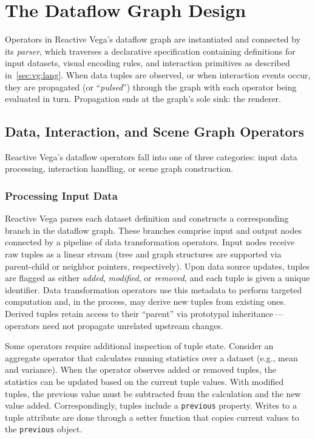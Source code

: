 \section{The Dataflow Graph Design}
\label{sec:vg:dataflow}

Operators in Reactive Vega's dataflow graph are instantiated and connected by
its \emph{parser}, which traverses a declarative specification containing
definitions for input datasets, visual encoding rules, and interaction
primitives as described in~\cref{sec:vg:lang}. When data tuples are observed, or
when interaction events occur, they are propagated (or ``\emph{pulsed}'')
through the graph with each operator being evaluated in turn. Propagation ends
at the graph's sole sink: the renderer.

\subsection{Data, Interaction, and Scene Graph Operators}

Reactive Vega's dataflow operators fall into one of three categories: input data
processing, interaction handling, or scene graph construction.

\subsubsection{Processing Input Data}

Reactive Vega parses each dataset definition and constructs a corresponding
branch in the dataflow graph. These branches comprise input and output nodes
connected by a pipeline of data transformation operators. Input nodes receive
raw tuples as a linear stream (tree and graph structures are supported via
parent-child or neighbor pointers, respectively). Upon data source updates,
tuples are flagged as either \emph{added}, \emph{modified}, or \emph{removed},
and each tuple is given a unique identifier. Data transformation operators use
this metadata to perform targeted computation and, in the process, may derive
new tuples from existing ones. Derived tuples retain access to their ``parent''
via prototypal inheritance\,---\,operators need not propagate unrelated upstream
changes.

Some operators require additional inspection of tuple state. Consider an
aggregate operator that calculates running statistics over a dataset (e.g.,
mean and variance). When the operator observes added or removed tuples, the
statistics can be updated based on the current tuple values. With modified
tuples, the previous value must be subtracted from the calculation and the new
value added. Correspondingly, tuples include a \texttt{previous} property.
Writes to a tuple attribute are done through a setter function that copies
current values to the \texttt{previous} object.

